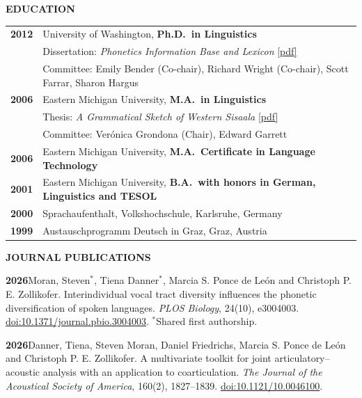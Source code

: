 \documentclass[11pt]{article}
\newcommand{\hangpara}{
 \setlength{\parindent}{0in} %
 \hangindent=0.42in %
}
\begin{document}
\begin{flushleft}
{\bf EDUCATION}
\end{flushleft}
\begin{tabular}{ll}
\bf 2012 & University of Washington, \textbf{Ph.D.\ in Linguistics} \\
& Dissertation: \textit{Phonetics Information Base and Lexicon} \href{https://digital.lib.washington.edu/researchworks/handle/1773/22452}{[pdf]} \\
& Committee: Emily Bender (Co-chair), Richard Wright (Co-chair), Scott Farrar, Sharon Hargus \\
\bf 2006 & Eastern Michigan University, \textbf{M.A.\ in Linguistics} \\
& Thesis: {\it A Grammatical Sketch of Western Sisaala} \href{http://commons.emich.edu/theses/73/}{[pdf]}\\
& Committee: Verónica Grondona (Chair), Edward Garrett \\
\bf 2006 & Eastern Michigan University, \textbf{M.A.\ Certificate in Language Technology} \\
\bf 2001 & Eastern Michigan University, \textbf{B.A.\ with honors in German, Linguistics and TESOL} \\
\bf 2000 & Sprachaufenthalt, Volkshochschule, Karlsruhe, Germany \\
\bf 1999 & Austauschprogramm Deutsch in Graz, Graz, Austria \\
\end{tabular}

\vskip 18pt
\begin{flushleft}
{\bf JOURNAL PUBLICATIONS}
\end{flushleft}


\hangpara
{\bf 2026}\hspace{1ex}Moran, Steven$^*$, Tiena Danner$^*$, Marcia S. Ponce de León and Christoph P. E. Zollikofer. Interindividual vocal tract diversity influences the phonetic diversification of spoken languages. \textit{PLOS Biology}, 24(10), e3004003. \href{https://doi.org/10.1371/journal.pbio.3004003}{doi:10.1371/journal.pbio.3004003}. $^*$Shared first authorship.

\vskip 6pt
\hangpara
{\bf 2026}\hspace{1ex}Danner, Tiena, Steven Moran, Daniel Friedrichs, Marcia S. Ponce de León and Christoph P. E. Zollikofer. A multivariate toolkit for joint articulatory--acoustic analysis with an application to coarticulation. \textit{The Journal of the Acoustical Society of America}, 160(2), 1827--1839. \href{https://doi.org/10.1121/10.0046100}{doi:10.1121/10.0046100}.
\end{document}
